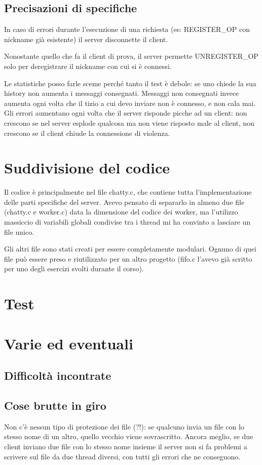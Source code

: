 \documentclass[a4paper]{article}
\theoremstyle{theorem}
\theoremstyle{remark}
\theoremstyle{definition}
\theoremstyle{corollary}
\theoremstyle{lemma}
\begin{document}
\subsection{Precisazioni di specifiche}
In caso di errori durante l'esecuzione di una richiesta (es: REGISTER\_OP con
nickname già esistente) il server disconnette il client.

Nonostante quello che fa il client di prova, il server permette UNREGISTER\_OP
solo per deregistrare il nickname con cui si è connessi.

Le statistiche posso farle sceme perché tanto il test è debole: se uno chiede la
sua history non aumenta i messaggi consegnati. Messaggi non consegnati invece
aumenta ogni volta che il tizio a cui devo inviare non è connesso, e non cala
mai. Gli errori aumentano ogni volta che il server risponde picche ad un client:
non crescono se nel server esplode qualcosa ma non viene risposto male al
client, non crescono se il client chiude la connessione di violenza.

\section{Suddivisione del codice}
Il codice è principalmente nel file chatty.c, che contiene tutta l'implementazione delle parti specifiche del server. Avevo pensato di separarlo in almeno due file (chatty.c e worker.c) data la dimensione del codice dei worker, ma l'utilizzo massiccio di variabili globali condivise tra i thread mi ha convinto a lasciare un file unico.

Gli altri file sono stati creati per essere completamente modulari. Ognuno di quei file può essere preso e riutilizzato per un altro progetto (fifo.c l'avevo già scritto per uno degli esercizi svolti durante il corso).

\section{Test}



\section{Varie ed eventuali}
\subsection{Difficoltà incontrate}

\subsection{Cose brutte in giro}
Non c'è nessun tipo di protezione dei file (?!): se qualcuno invia un file con
lo stesso nome di un altro, quello vecchio viene sovrascritto. Ancora meglio, se
due client inviano due file con lo stesso nome insieme il server non si fa
problemi a scrivere sul file da due thread diversi, con tutti gli errori che ne
conseguono. 
\end{document}

